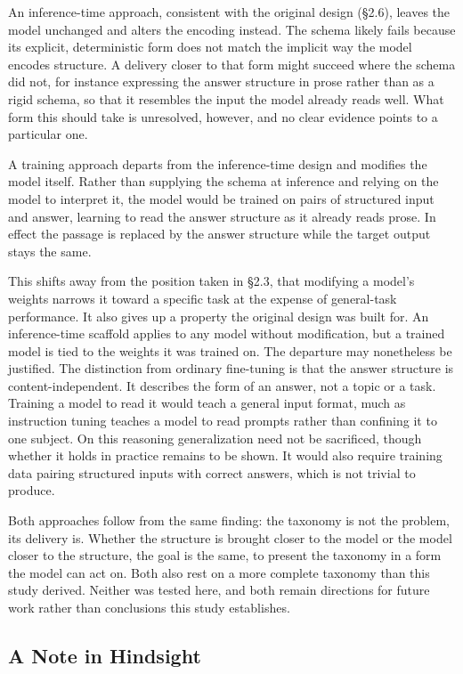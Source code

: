 \documentclass{article}
\begin{document}
An inference-time approach, consistent with the original design (\S2.6), leaves the model unchanged and alters the encoding instead. The schema likely fails because its explicit, deterministic form does not match the implicit way the model encodes structure. A delivery closer to that form might succeed where the schema did not, for instance expressing the answer structure in prose rather than as a rigid schema, so that it resembles the input the model already reads well. What form this should take is unresolved, however, and no clear evidence points to a particular one.

A training approach departs from the inference-time design and modifies the model itself. Rather than supplying the schema at inference and relying on the model to interpret it, the model would be trained on pairs of structured input and answer, learning to read the answer structure as it already reads prose. In effect the passage is replaced by the answer structure while the target output stays the same.

This shifts away from the position taken in \S2.3, that modifying a model's weights narrows it toward a specific task at the expense of general-task performance. It also gives up a property the original design was built for. An inference-time scaffold applies to any model without modification, but a trained model is tied to the weights it was trained on. The departure may nonetheless be justified. The distinction from ordinary fine-tuning is that the answer structure is content-independent. It describes the form of an answer, not a topic or a task. Training a model to read it would teach a general input format, much as instruction tuning teaches a model to read prompts rather than confining it to one subject. On this reasoning generalization need not be sacrificed, though whether it holds in practice remains to be shown. It would also require training data pairing structured inputs with correct answers, which is not trivial to produce.

Both approaches follow from the same finding: the taxonomy is not the problem, its delivery is. Whether the structure is brought closer to the model or the model closer to the structure, the goal is the same, to present the taxonomy in a form the model can act on. Both also rest on a more complete taxonomy than this study derived. Neither was tested here, and both remain directions for future work rather than conclusions this study establishes.

\subsection{A Note in Hindsight}
\end{document}
